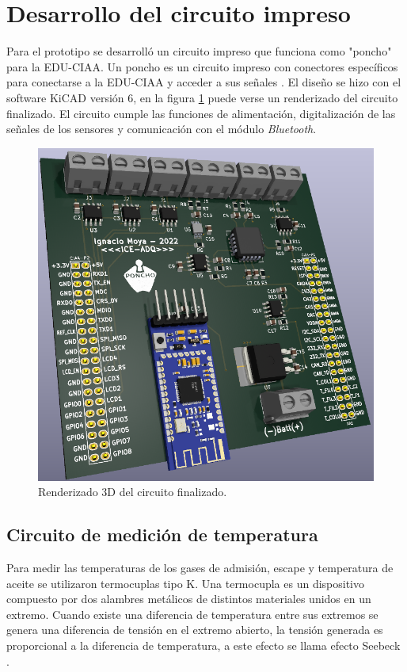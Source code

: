 \section{Desarrollo del circuito impreso} \label{circuito}

Para el prototipo se desarrolló un circuito impreso que funciona como "poncho" para la EDU-CIAA. Un poncho es un circuito impreso con conectores específicos para conectarse a la EDU-CIAA y acceder a sus señales \cite{poncho}. El diseño se hizo con el software KiCAD versión 6, en la figura \ref{fig:circuito-3d} puede verse un renderizado del circuito finalizado. El circuito cumple las funciones de alimentación, digitalización de las señales de los sensores y comunicación con el módulo \textit{Bluetooth}.

\begin{figure}[htpb]
\centering
\includegraphics[width=.8\textwidth]{./Figures/circuito-3d.png}
\caption{Renderizado 3D del circuito finalizado.}
\label{fig:circuito-3d}
\end{figure}

\subsection{Circuito de medición de temperatura}

Para medir las temperaturas de los gases de admisión, escape y temperatura de aceite se utilizaron termocuplas tipo K. Una termocupla es un dispositivo compuesto por dos alambres metálicos de distintos materiales unidos en un extremo. Cuando existe una diferencia de temperatura entre sus extremos se genera una diferencia de tensión en el extremo abierto, la tensión generada es proporcional a la diferencia de temperatura, a este efecto se llama efecto Seebeck \cite{termocupla}.

